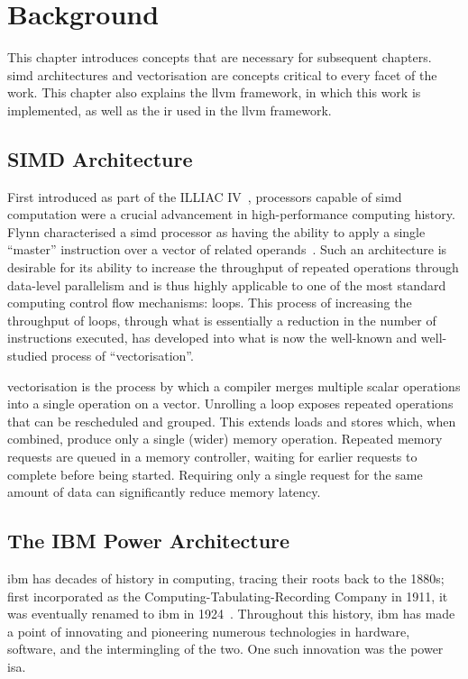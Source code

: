 \documentclass[\main/thesis.tex]{subfiles}
\begin{document}
\chapter{Background}
\label{cha:background}
This chapter introduces concepts that are necessary for subsequent chapters.
\gls{simd} architectures and vectorisation are concepts critical to every facet of the work.
This chapter also explains the \gls{llvm} framework, in which this work is implemented, as well as the \gls{ir} used in the \gls{llvm} framework.

\section{SIMD Architecture}
\label{sec:simd}
First introduced as part of the ILLIAC IV~\autocite{barnes1968illiac}, processors capable of \gls{simd} computation were a crucial advancement in high-performance computing history.
Flynn characterised a \gls{simd} processor as having the ability to apply a single ``master'' instruction over a vector of related operands~\autocite{flynn1972some}.
Such an architecture is desirable for its ability to increase the throughput of repeated operations through data-level parallelism and is thus highly applicable to one of the most standard computing control flow mechanisms: loops.
This process of increasing the throughput of loops, through what is essentially a reduction in the number of instructions executed, has developed into what is now the well-known and well-studied process of ``\gls{vectorisation}''.

\Gls{vectorisation} is the process by which a compiler merges multiple scalar operations into a single operation on a vector.
Unrolling a loop exposes repeated operations that can be rescheduled and grouped.
This extends loads and stores which, when combined, produce only a single (wider) memory operation.
Repeated memory requests are queued in a memory controller, waiting for earlier requests to complete before being started.
Requiring only a single request for the same amount of data can significantly reduce memory latency.

\section{The IBM Power Architecture}
\Gls{ibm} has decades of history in computing, tracing their roots back to the 1880s; first incorporated as the Computing-Tabulating-Recording Company in 1911, it was eventually renamed to \gls{ibm} in 1924~\autocite{ibmarchive}.
Throughout this history, \gls{ibm} has made a point of innovating and pioneering numerous technologies in hardware, software, and the intermingling of the two.
One such innovation was the \gls{power} \gls{isa}.
\end{document}
